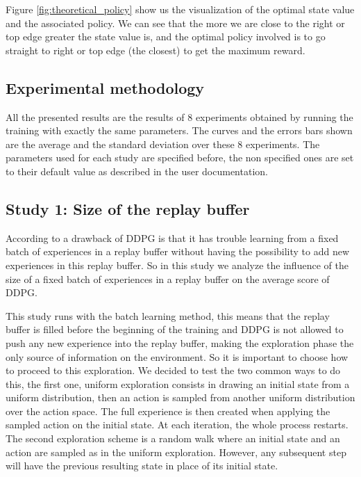 \documentclass{article}
\begin{document}
Figure \ref{fig:theoretical_policy} show us the visualization of the optimal state value and the associated policy. We can see that the more we are close to the right or top edge greater the state value is, and the optimal policy involved is to go straight to right or top edge (the closest) to get the maximum reward.

\subsection{Experimental methodology}

All the presented results are the results of 8 experiments obtained by running the training with exactly the same parameters. The curves and the errors bars shown are the average and the standard deviation over these 8 experiments. The parameters used for each study are specified before, the non specified ones are set to their default value as described in the user documentation.

\subsection{Study 1: Size of the replay buffer}

According to \cite{fujimoto_off-policy_2018} a drawback of DDPG is that it has trouble learning from a fixed batch of experiences in a replay buffer without having the possibility to add new experiences in this replay buffer. So in this study we analyze the influence of the size of a fixed batch of experiences in a replay buffer on the average score of DDPG.

This study runs with the batch learning method, this means that the replay buffer is filled before the beginning of the training and DDPG is not allowed to push any new experience into the replay buffer, making the exploration phase the only source of information on the environment. So it is important to choose how to proceed to this exploration. We decided to test the two common ways to do this, the first one, uniform exploration consists in drawing an initial state from a uniform distribution, then an action is sampled from another uniform distribution over the action space. The full experience is then created when applying the sampled action on the initial state. At each iteration, the whole process restarts. The second exploration scheme is a random walk where an initial state and an action are sampled as in the uniform exploration. However, any subsequent step will have the previous resulting state in place of its initial state.
\end{document}
